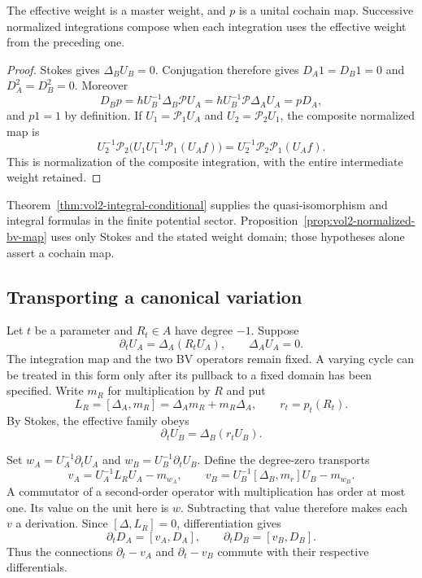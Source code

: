 \begin{proposition}\label{prop:vol2-normalized-bv-map}
The effective weight is a master weight, and $p$ is a unital
cochain map. Successive normalized integrations compose when
each integration uses the effective weight from the preceding
one.
\end{proposition}
\begin{proof}
Stokes gives $\Delta_BU_B=0$. Conjugation therefore gives
$D_A1=D_B1=0$ and $D_A^2=D_B^2=0$. Moreover
\[
 D_Bp
   =\hbar U_B^{-1}\Delta_B\mathcal P U_A
   =\hbar U_B^{-1}\mathcal P\Delta_AU_A=pD_A,
\]
and $p1=1$ by definition. If $U_1=\mathcal P_1U_A$ and
$U_2=\mathcal P_2U_1$, the composite normalized map is
\[
 U_2^{-1}\mathcal P_2
        \bigl(U_1U_1^{-1}\mathcal P_1(U_Af)\bigr)
       =U_2^{-1}\mathcal P_2\mathcal P_1(U_Af).
\]
This is normalization of the composite integration, with
the entire intermediate weight retained.
\end{proof}

Theorem~\ref{thm:vol2-integral-conditional} supplies the
quasi-isomorphism and integral formulas in the finite
potential sector. Proposition~\ref{prop:vol2-normalized-bv-map}
uses only Stokes and the stated weight domain; those
hypotheses alone assert a cochain map.

\subsection{Transporting a canonical variation}

Let $t$ be a parameter and $R_t\in A$ have degree $-1$.
Suppose
\begin{equation}\label{eq:vol2-canonical-master-family}
 \partial_tU_A=\Delta_A(R_tU_A),\qquad \Delta_AU_A=0.
\end{equation}
The integration map and the two BV operators remain fixed.
A varying cycle can be treated in this form only after
its pullback to a fixed domain has been specified.
Write $m_R$ for multiplication by $R$ and put
\[
 L_R=[\Delta_A,m_R]=\Delta_Am_R+m_R\Delta_A,
 \qquad r_t=p_t(R_t).
\]
By Stokes, the effective family obeys
\begin{equation}\label{eq:vol2-effective-master-family}
 \partial_tU_B=\Delta_B(r_tU_B).
\end{equation}

Set $w_A=U_A^{-1}\partial_tU_A$ and
$w_B=U_B^{-1}\partial_tU_B$. Define the degree-zero transports
\begin{equation}\label{eq:vol2-normalized-transports}
 v_A=U_A^{-1}L_RU_A-m_{w_A},\qquad
 v_B=U_B^{-1}[\Delta_B,m_r]U_B-m_{w_B}.
\end{equation}
A commutator of a second-order operator with multiplication
has order at most one. Its value on the unit here is $w$.
Subtracting that value therefore makes each $v$ a derivation.
Since $[\Delta,L_R]=0$, differentiation gives
\begin{equation}\label{eq:vol2-moving-differentials}
 \partial_tD_A=[v_A,D_A],\qquad
 \partial_tD_B=[v_B,D_B].
\end{equation}
Thus the connections $\partial_t-v_A$ and $\partial_t-v_B$
commute with their respective differentials.


